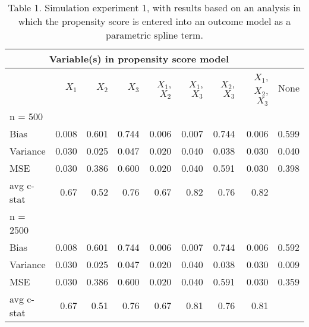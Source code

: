 \documentclass[10,a4paperpaper,]{article}
\begin{document}
\begin{table}
\caption{Table 1. Simulation experiment 1, with results based on an analysis in which the propensity score is entered into an outcome model as a parametric spline term.}
\begin{tabular}{l r r r r r r r r}
\hline
\multicolumn{8}{c}{Variable(s) in propensity score model}\\
\hline
  & $X_{1}$ & $X_{2}$ & $X_{3}$ & $X_{1}$, $X_{2}$ & $X_{1}$, $X_{3}$ & $X_{2}$, $X_{3}$ & $X_{1}$, $X_{2}$, $X_{3}$ & None\\
\hline
n = 500\\

Bias & 0.008 & 0.601 & 0.744 & 0.006 & 0.007 & 0.744 & 0.006 & 0.599\\

Variance & 0.030 & 0.025 & 0.047 & 0.020 & 0.040 & 0.038 & 0.030 & 0.040\\

MSE & 0.030 & 0.386 & 0.600 & 0.020 & 0.040 & 0.591 & 0.030 & 0.398\\

avg c-stat & 0.67 & 0.52 & 0.76 & 0.67 & 0.82 & 0.76 & 0.82 & \\

n = 2500\\

Bias & 0.008 & 0.601 & 0.744 & 0.006 & 0.007 & 0.744 & 0.006 & 0.592\\

Variance & 0.030 & 0.025 & 0.047 & 0.020 & 0.040 & 0.038 & 0.030 & 0.009\\

MSE & 0.030 & 0.386 & 0.600 & 0.020 & 0.040 & 0.591 & 0.030 & 0.359\\

avg c-stat & 0.67 & 0.51 & 0.76 & 0.67 & 0.81 & 0.76 & 0.81 & \\
\hline
\end{tabular}
\end{table}
\end{document}
